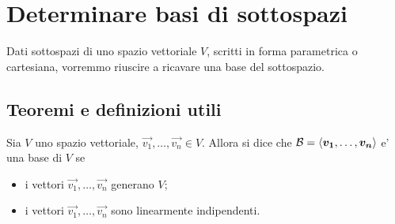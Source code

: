 \chapter{Determinare basi di sottospazi}

Dati sottospazi di uno spazio vettoriale $V$, scritti in forma parametrica o cartesiana, vorremmo riuscire a ricavare una base del sottospazio.

\section{Teoremi e definizioni utili}

\begin{definition}
    Sia $V$ uno spazio vettoriale, $\vec{v_1}, \dots, \vec{v_n} \in V$. Allora si dice che $\mathcal{B} = \left\langle \bm{v_1}, \dots, \bm{v_n} \right\rangle$ e' una base di $V$ se
    \begin{itemize}
        \item i vettori $\vec{v_1}, \dots, \vec{v_n}$ generano $V$;
        \item i vettori $\vec{v_1}, \dots, \vec{v_n}$ sono linearmente indipendenti.
    \end{itemize}
\end{definition}

